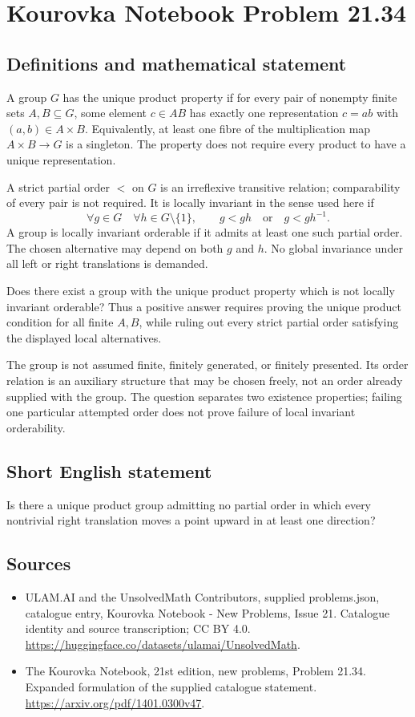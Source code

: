 \documentclass[11pt,a4paper]{article}
\begin{document}
\section*{Kourovka Notebook Problem 21.34}\label{statement}

\subsection{Definitions and mathematical statement}
A group $G$ has the unique product property if for every pair of
nonempty finite sets $A,B\subseteq G$, some element $c\in AB$ has
exactly one representation $c=ab$ with $(a,b)\in A\times B$.
Equivalently, at least one fibre of the multiplication map
$A\times B\to G$ is a singleton. The property does not require every
product to have a unique representation.

A strict partial order $<$ on $G$ is an irreflexive transitive relation;
comparability of every pair is not required. It is locally invariant
in the sense used here if
\[
 \forall g\in G\quad\forall h\in G\setminus\{1\},\qquad
 g<gh\quad\text{or}\quad g<gh^{-1}.
\]
A group is locally invariant orderable if it admits at least one such
partial order. The chosen alternative may depend on both $g$ and $h$.
No global invariance under all left or right translations is demanded.

Does there exist a group with the unique product property which is not
locally invariant orderable? Thus a positive answer requires proving the
unique product condition for all finite $A,B$, while ruling out every
strict partial order satisfying the displayed local alternatives.

The group is not assumed finite, finitely generated, or finitely
presented. Its order relation is an auxiliary structure that may be
chosen freely, not an order already supplied with the group. The
question separates two existence properties; failing one particular
attempted order does not prove failure of local invariant orderability.
\subsection{Short English statement}
Is there a unique product group admitting no partial order in which every nontrivial right translation moves a point upward in at least one direction?
\subsection{Sources}
\begin{itemize}
\item[S1] ULAM.AI and the UnsolvedMath Contributors, supplied problems.json, catalogue entry, Kourovka Notebook - New Problems, Issue 21. Catalogue identity and source transcription; CC BY 4.0.
\url{https://huggingface.co/datasets/ulamai/UnsolvedMath}.
\item[S2] The Kourovka Notebook, 21st edition, new problems, Problem 21.34. Expanded formulation of the supplied catalogue statement.
\url{https://arxiv.org/pdf/1401.0300v47}.
\end{itemize}
\end{document}
